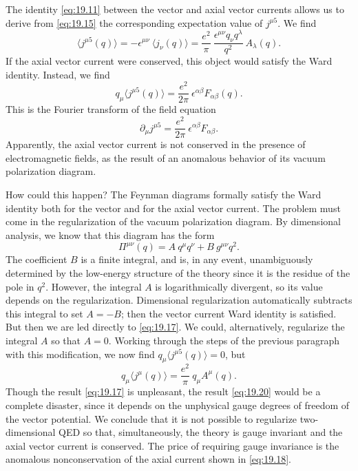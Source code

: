 The identity \eqref{eq:19.11} between the vector and axial vector currents
allows us to derive from \eqref{eq:19.15} the corresponding expectation value
of $j^{\mu 5}$.  We find
\begin{equation}
  \langle j^{\mu 5}(q)\rangle = -\epsilon^{\mu\nu}\ \langle j_\nu(q)\rangle
  = \frac{e^2}{\pi}\ \frac{\epsilon^{\mu\nu}q_\nu q^\lambda}{q^2}\ A_\lambda(q)
  .
  \label{eq:19.16}
\end{equation}
If the axial vector current were conserved, this object would satisfy the Ward
identity.  Instead, we find
\begin{equation}
  q_\mu\langle j^{\mu 5}(q)\rangle = \frac{e^2}{2\pi}\ \epsilon^{\alpha\beta}
    F_{\alpha\beta}(q) .
  \label{eq:19.17}
\end{equation}
This is the Fourier transform of the field equation
\begin{equation}
  \partial_\mu j^{\mu 5} = \frac{e^2}{2\pi}\ \epsilon^{\alpha\beta}F_{\alpha\beta}
  .
  \label{eq:19.18}
\end{equation}
Apparently, the axial vector current is not conserved in the presence of
electromagnetic fields, as the result of an anomalous behavior of its vacuum
polarization diagram.

How could this happen?  The Feynman diagrams formally satisfy the Ward
identity both for the vector and for the axial vector current.  The problem
must come in the regularization of the vacuum polarization diagram.  By
dimensional analysis, we know that this diagram has the form
\begin{equation}
  \Pi^{\mu\nu}(q) = A\ q^\mu q^\nu + B\ g^{\mu\nu}q^2 .
  \label{eq:19.19}
\end{equation}
The coefficient $B$ is a finite integral, and is, in any event, unambiguously
determined by the low-energy structure of the theory since it is the residue
of the pole in $q^2$.  However, the integral $A$ is logarithmically divergent,
so its value depends on the regularization.  Dimensional regularization
automatically subtracts this integral to set $A = -B$; then the vector
current Ward identity is satisfied.  But then we are led directly to
\eqref{eq:19.17}.  We could, alternatively, regularize the integral $A$ so that
$A = 0$.  Working through the steps of the previous paragraph with this
modification, we now find $q_\mu\langle j^{\mu 5}(q)\rangle = 0$, but
\begin{equation}
  q_\mu\langle j^\mu(q)\rangle = \frac{e^2}{\pi}\ q_\mu A^\mu(q) .
  \label{eq:19.20}
\end{equation}
Though the result \eqref{eq:19.17} is unpleasant, the result \eqref{eq:19.20}
would be a complete disaster, since it depends on the unphysical gauge
degrees of freedom of the vector potential.  We conclude that it is not
possible to regularize two-dimensional QED so that, simultaneously, the theory
is gauge invariant and the axial vector current is conserved.  The price of
requiring gauge invariance is the anomalous nonconservation of the axial
current shown in \eqref{eq:19.18}.

